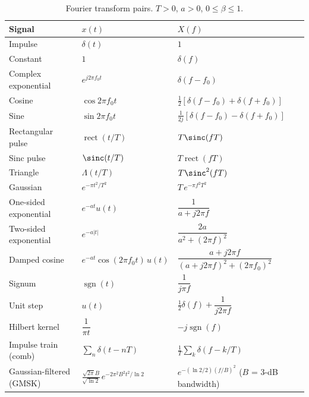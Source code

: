 \begin{table}[htbp]\centering\small
\caption{Fourier transform pairs. $T>0$, $a>0$, $0\le\beta\le1$.}\label{tab:appA:ftpairs}
\renewcommand{\arraystretch}{1.25}
\begin{tabular}{@{}lll@{}}
\toprule
Signal & $x(t)$ & $X(f)$\\
\midrule
Impulse & $\delta(t)$ & $1$\\
Constant & $1$ & $\delta(f)$\\
Complex exponential & $e^{j2\pi f_0t}$ & $\delta(f-f_0)$\\
Cosine & $\cos 2\pi f_0 t$ & $\tfrac12[\delta(f-f_0)+\delta(f+f_0)]$\\
Sine & $\sin 2\pi f_0 t$ & $\tfrac1{2j}[\delta(f-f_0)-\delta(f+f_0)]$\\
Rectangular pulse & $\operatorname{rect}(t/T)$ & $T\sinc(fT)$\\
Sinc pulse & $\sinc(t/T)$ & $T\operatorname{rect}(fT)$\\
Triangle & $\Lambda(t/T)$ & $T\sinc^2(fT)$\\
Gaussian & $e^{-\pi t^2/T^2}$ & $T\,e^{-\pi f^2T^2}$\\
One-sided exponential & $e^{-at}u(t)$ & $\dfrac{1}{a+j2\pi f}$\\
Two-sided exponential & $e^{-a|t|}$ & $\dfrac{2a}{a^2+(2\pi f)^2}$\\
Damped cosine & $e^{-at}\cos(2\pi f_0t)\,u(t)$ & $\dfrac{a+j2\pi f}{(a+j2\pi f)^2+(2\pi f_0)^2}$\\
Signum & $\operatorname{sgn}(t)$ & $\dfrac{1}{j\pi f}$\\
Unit step & $u(t)$ & $\tfrac12\delta(f)+\dfrac{1}{j2\pi f}$\\
Hilbert kernel & $\dfrac{1}{\pi t}$ & $-j\operatorname{sgn}(f)$\\
Impulse train (comb) & $\sum_n\delta(t-nT)$ & $\frac1T\sum_k\delta(f-k/T)$\\
Gaussian-filtered (GMSK) & $\frac{\sqrt{2\pi}B}{\sqrt{\ln2}}\,e^{-2\pi^2B^2t^2/\ln2}$ & $e^{-(\ln 2/2)(f/B)^2}$ ($B$ = 3-dB bandwidth)\\
\bottomrule
\end{tabular}
\end{table}


